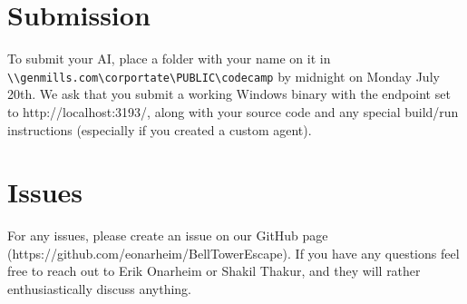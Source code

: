 \documentclass{article}
\begin{document}
\section*{Submission}
To submit your AI, place a folder with your name on it in \verb|\\genmills.com\corportate\PUBLIC\codecamp| by midnight on Monday July 20th. We ask that you submit a working Windows binary with the endpoint set to http://localhost:3193/, along with your source code and any special build/run instructions (especially if you created a custom agent).

\section*{Issues}
For any issues, please create an issue on our GitHub page (https://github.com/eonarheim/BellTowerEscape). If you have any questions feel free to reach out to Erik Onarheim or Shakil Thakur, and they will rather enthusiastically discuss anything.
\end{document}
